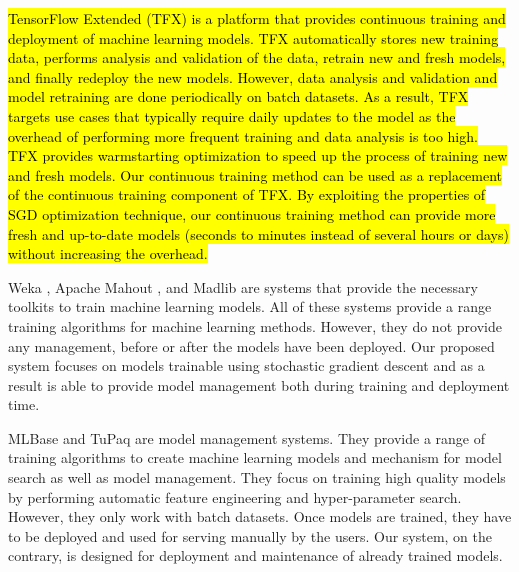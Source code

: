 \hl{TensorFlow Extended (TFX) is a platform that provides continuous training and deployment of machine learning models.
TFX automatically stores new training data, performs analysis and validation of the data, retrain new and fresh models, and finally redeploy the new models. 
However, data analysis and validation and model retraining are done periodically on batch datasets.
As a result, TFX targets use cases that typically require daily updates to the model as the overhead of performing more frequent training and data analysis is too high.
TFX provides warmstarting optimization to speed up the process of training new and fresh models.
Our continuous training method can be used as a replacement of the continuous training component of TFX.
By exploiting the properties of SGD optimization technique, our continuous training method can provide more fresh and up-to-date models (seconds to minutes instead of several hours or days) without increasing the overhead.}

Weka \cite{hall2009weka}, Apache Mahout \cite{Owen:2011:MA:2132656}, and Madlib \cite{hellerstein2012madlib} are systems that provide the necessary toolkits to train machine learning models. 
All of these systems provide a range training algorithms for machine learning methods. 
However, they do not provide any management, before or after the models have been deployed. 
Our proposed system focuses on models trainable using stochastic gradient descent and as a result is able to provide model management both during training and deployment time.

MLBase \cite{kraska2013mlbase} and TuPaq \cite{sparks2015tupaq} are model management systems.
They provide a range of training algorithms to create machine learning models and mechanism for model search as well as model management.
They focus on training high quality models by performing automatic feature engineering and hyper-parameter search.
However, they only work with batch datasets.
Once models are trained, they have to be deployed and used for serving manually by the users.
Our system, on the contrary, is designed for deployment and maintenance of already trained models.

